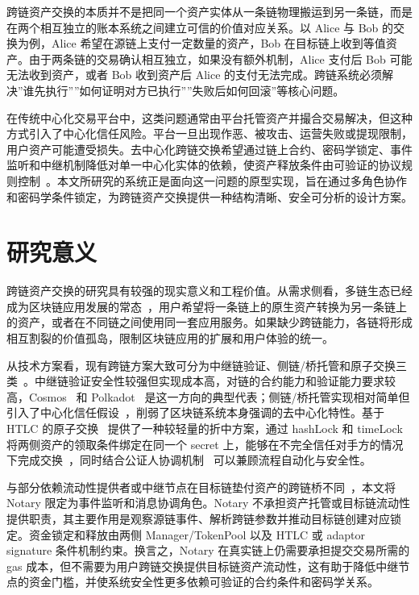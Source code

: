 跨链资产交换的本质并不是把同一个资产实体从一条链物理搬运到另一条链，而是在两个相互独立的账本系统之间建立可信的价值对应关系。以 Alice 与 Bob 的交换为例，Alice 希望在源链上支付一定数量的资产，Bob 在目标链上收到等值资产。由于两条链的交易确认相互独立，如果没有额外机制，Alice 支付后 Bob 可能无法收到资产，或者 Bob 收到资产后 Alice 的支付无法完成。跨链系统必须解决”谁先执行””如何证明对方已执行””失败后如何回滚”等核心问题。

在传统中心化交易平台中，这类问题通常由平台托管资产并撮合交易解决，但这种方式引入了中心化信任风险。平台一旦出现作恶、被攻击、运营失败或提现限制，用户资产可能遭受损失。去中心化跨链交换希望通过链上合约、密码学锁定、事件监听和中继机制降低对单一中心化实体的依赖，使资产释放条件由可验证的协议规则控制~\cite{zamyatin2021sok}。本文所研究的系统正是面向这一问题的原型实现，旨在通过多角色协作和密码学条件锁定，为跨链资产交换提供一种结构清晰、安全可分析的设计方案。

\section{研究意义}

跨链资产交换的研究具有较强的现实意义和工程价值。从需求侧看，多链生态已经成为区块链应用发展的常态~\cite{JSGG202402003,lohachab2021towards}，用户希望将一条链上的原生资产转换为另一条链上的资产，或者在不同链之间使用同一套应用服务。如果缺少跨链能力，各链将形成相互割裂的价值孤岛，限制区块链应用的扩展和用户体验的统一。

从技术方案看，现有跨链方案大致可分为中继链验证、侧链/桥托管和原子交换三类~\cite{Zhu2024,3845}。中继链验证安全性较强但实现成本高，对链的合约能力和验证能力要求较高，Cosmos~\cite{kwon2019cosmos} 和 Polkadot~\cite{wood2016polkadot} 是这一方向的典型代表；侧链/桥托管实现相对简单但引入了中心化信任假设~\cite{back2014enabling,singh2020sidechain}，削弱了区块链系统本身强调的去中心化特性。基于 HTLC 的原子交换~\cite{10.1145/3212734.3212736} 提供了一种较轻量的折中方案，通过 hashLock 和 timeLock 将两侧资产的领取条件绑定在同一个 secret 上，能够在不完全信任对手方的情况下完成交换~\cite{poon2016bitcoin}，同时结合公证人协调机制~\cite{xiong2022notary,9860209} 可以兼顾流程自动化与安全性。

与部分依赖流动性提供者或中继节点在目标链垫付资产的跨链桥不同~\cite{yin2022bool}，本文将 Notary 限定为事件监听和消息协调角色。Notary 不承担资产托管或目标链流动性提供职责，其主要作用是观察源链事件、解析跨链参数并推动目标链创建对应锁定。资金锁定和释放由两侧 Manager/TokenPool 以及 HTLC 或 adaptor signature 条件机制约束。换言之，Notary 在真实链上仍需要承担提交交易所需的 gas 成本，但不需要为用户跨链交换提供目标链资产流动性，这有助于降低中继节点的资金门槛，并使系统安全性更多依赖可验证的合约条件和密码学关系。

